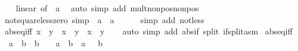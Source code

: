 \begin{isabellebody}
%
\isadelimproof
\ \ %
\endisadelimproof
%
\isatagproof
{}\isamarkupfalse%
\ linear\ {\isacharbrackleft}{\kern0pt}of\ {}\ a{\isacharbrackright}{\kern0pt}\ \isamarkupfalse%
\ {\isacharparenleft}{\kern0pt}auto\ simp\ add{\isacharcolon}{\kern0pt}\ mult{\isacharunderscore}{\kern0pt}nonpos{\isacharunderscore}{\kern0pt}nonpos{\isacharparenright}{\kern0pt}%
\endisatagproof
{\isafoldproof}%
%
\isadelimproof
\isanewline
%
\endisadelimproof
\isanewline
{}\isamarkupfalse%
\ not{\isacharunderscore}{\kern0pt}square{\isacharunderscore}{\kern0pt}less{\isacharunderscore}{\kern0pt}zero\ {\isacharbrackleft}{\kern0pt}simp{\isacharbrackright}{\kern0pt}{\isacharcolon}{\kern0pt}\ {\isachardoublequoteopen}{\isasymnot}\ {\isacharparenleft}{\kern0pt}a\ {\isacharasterisk}{\kern0pt}\ a\ {\isacharless}{\kern0pt}\ {}{\isacharparenright}{\kern0pt}{\isachardoublequoteclose}\isanewline
%
\isadelimproof
\ \ %
\endisadelimproof
%
\isatagproof
{}\isamarkupfalse%
\ {\isacharparenleft}{\kern0pt}simp\ add{\isacharcolon}{\kern0pt}\ not{\isacharunderscore}{\kern0pt}less{\isacharparenright}{\kern0pt}%
\endisatagproof
{\isafoldproof}%
%
\isadelimproof
\isanewline
%
\endisadelimproof
\isanewline
{}\isamarkupfalse%
\ abs{\isacharunderscore}{\kern0pt}eq{\isacharunderscore}{\kern0pt}iff{\isacharcolon}{\kern0pt}\ {\isachardoublequoteopen}{\isasymbar}x{\isasymbar}\ {\isacharequal}{\kern0pt}\ {\isasymbar}y{\isasymbar}\ {\isasymlongleftrightarrow}\ x\ {\isacharequal}{\kern0pt}\ y\ {\isasymor}\ x\ {\isacharequal}{\kern0pt}\ {\isacharminus}{\kern0pt}y{\isachardoublequoteclose}\isanewline
%
\isadelimproof
\ \ %
\endisadelimproof
%
\isatagproof
{}\isamarkupfalse%
\ {\isacharparenleft}{\kern0pt}auto\ simp\ add{\isacharcolon}{\kern0pt}\ abs{\isacharunderscore}{\kern0pt}if\ split{\isacharcolon}{\kern0pt}\ if{\isacharunderscore}{\kern0pt}split{\isacharunderscore}{\kern0pt}asm{\isacharparenright}{\kern0pt}%
\endisatagproof
{\isafoldproof}%
%
\isadelimproof
\isanewline
%
\endisadelimproof
\isanewline
{}\isamarkupfalse%
\ abs{\isacharunderscore}{\kern0pt}eq{\isacharunderscore}{\kern0pt}iff{\isacharprime}{\kern0pt}{\isacharcolon}{\kern0pt}\isanewline
\ \ {\isachardoublequoteopen}{\isasymbar}a{\isasymbar}\ {\isacharequal}{\kern0pt}\ b\ {\isasymlongleftrightarrow}\ b\ {\isasymge}\ {}\ {\isasymand}\ {\isacharparenleft}{\kern0pt}a\ {\isacharequal}{\kern0pt}\ b\ {\isasymor}\ a\ {\isacharequal}{\kern0pt}\ {\isacharminus}{\kern0pt}\ b{\isacharparenright}{\kern0pt}{\isachardoublequoteclose}\isanewline

\end{isabellebody}

